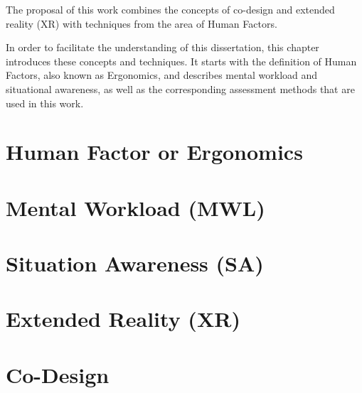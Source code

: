 
The proposal of this work combines the concepts of co-design and extended reality (XR) with techniques from the area of Human Factors. 

In order to facilitate the understanding of this dissertation, this chapter introduces these concepts and techniques. It starts with the definition of Human Factors, also known as Ergonomics, and describes mental workload and situational awareness, as well as the corresponding assessment methods that are used in this work. 


\section{Human Factor or Ergonomics}
\label{sec:human_factors}

    

\section{Mental Workload (MWL)}
\label{sec:mental_workload}

    

\section{Situation Awareness (SA)}
\label{sec:situation_awareness}

    

\section{Extended Reality (XR)}
\label{sec:extended_reality}

        
    

\section{Co-Design}
\label{sec:co_design}

    